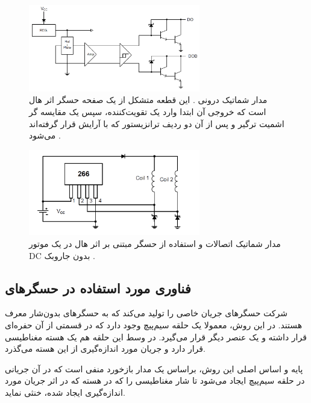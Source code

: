 \begin{figure}[t]
	
	\centering 
	\includegraphics[width=75mm]{Images/8.png}
	\caption{مدار شماتیک درونی . این قطعه متشکل از یک صفحه حسگر اثر هال است که خروجی آن ابتدا وارد یک تقویت‌کننده، سپس یک مقایسه گر اشمیت ترگیر و پس از آن دو ردیف ترانزیستور
		که با آرایش
		قرار گرفته‌اند می‌شود
		\cite{ah266}.
	}\label{fig:8}
\end{figure}


\begin{figure}[t]
	
	\centering 
	\includegraphics[width=75mm]{Images/9.png}
	\caption{
		مدار شماتیک اتصالات و استفاده از حسگر مبتنی بر اثر هال  در یک موتور DC بدون جاروبک
		\cite{ah266}.
	}\label{fig:9}
\end{figure}


\subsection{فناوری مورد استفاده در حسگر‌های }

شرکت   حسگرهای جریان خاصی را تولید می‌کند که به حسگر‌های بدون‌شار
معرف هستند. در این روش، معمولا یک حلقه سیم‌پیچ وجود دارد که در قسمتی از آن حفره‌ای قرار داشته و یک عنصر دیگر قرار می‌گیرد. در وسط این حلقه‌ هم یک هسته مغناطیسی قرار دارد و جریان مورد اندازه‌گیری از این هسته می‌گذرد.

پایه و اساس اصلی این روش، براساس یک مدار بازخورد منفی
است که در آن جریانی در حلقه سیم‌پیچ ایجاد می‌شود تا شار مغناطیسی را که در هسته که در اثر جریان مورد اندازه‌گیری ایجاد شده، خنثی نماید.


